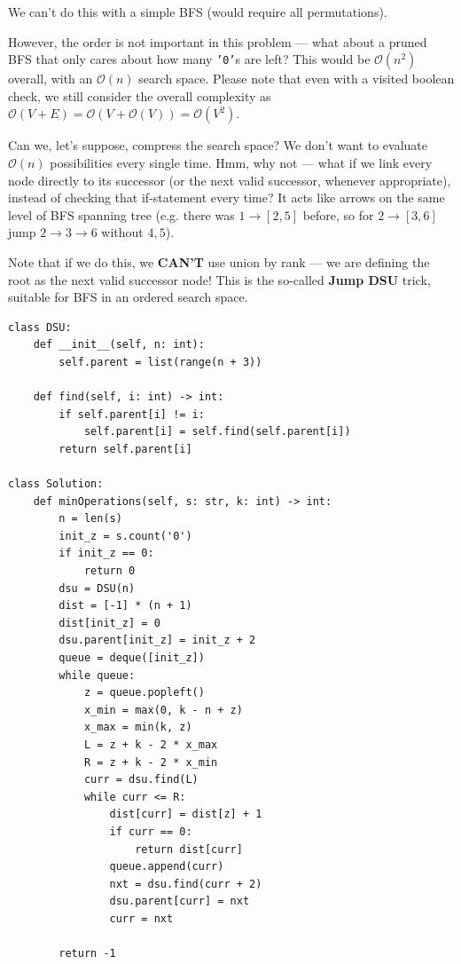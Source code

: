 \documentclass{article}
\begin{document}
We can't do this with a simple BFS (would require all permutations).

However, the order is not important in this problem --- what about a pruned BFS that only cares about how many \texttt{'0'}s are left? This would be $\mathcal O(n^2)$ overall, with an $\mathcal O(n)$ search space.
Please note that even with a visited boolean check, we still consider the overall complexity as $\mathcal O(V+E) = \mathcal O(V+\mathcal O(V)) = \mathcal O(V^2)$.

Can we, let's suppose, compress the search space? We don't want to evaluate $\mathcal O(n)$ possibilities every single time. Hmm, why not --- what if we link every node directly to its successor (or the next valid successor, whenever appropriate), instead of checking that if-statement every time? It acts like arrows on the same level of BFS spanning tree (e.g. there was $1\rightarrow[2,5]$ before, so for $2\rightarrow[3,6]$ jump $2\rightarrow3\rightarrow6$ without $4,5$).

Note that if we do this, we \textbf{CAN'T} use union by rank --- we are defining the root as the next valid successor node! This is the so-called \textbf{Jump DSU} trick, suitable for BFS in an ordered search space.

\begin{lstlisting}[style=python]
class DSU:
    def __init__(self, n: int):
        self.parent = list(range(n + 3))

    def find(self, i: int) -> int:
        if self.parent[i] != i:
            self.parent[i] = self.find(self.parent[i])
        return self.parent[i]

class Solution:
    def minOperations(self, s: str, k: int) -> int:
        n = len(s)
        init_z = s.count('0')
        if init_z == 0:
            return 0
        dsu = DSU(n)
        dist = [-1] * (n + 1)
        dist[init_z] = 0
        dsu.parent[init_z] = init_z + 2
        queue = deque([init_z])
        while queue:
            z = queue.popleft()
            x_min = max(0, k - n + z)
            x_max = min(k, z)
            L = z + k - 2 * x_max
            R = z + k - 2 * x_min
            curr = dsu.find(L)
            while curr <= R:
                dist[curr] = dist[z] + 1
                if curr == 0:
                    return dist[curr]
                queue.append(curr)
                nxt = dsu.find(curr + 2)
                dsu.parent[curr] = nxt
                curr = nxt
                
        return -1
\end{lstlisting}
\end{document}
